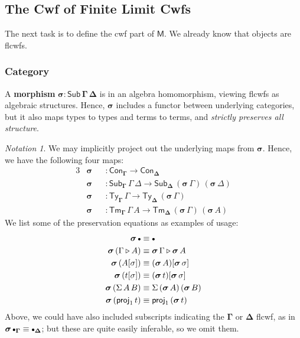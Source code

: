 \documentclass[12pt,a4paper,twoside,openany]{book}
\theoremstyle{remark}
\newtheorem{notation}{Notation}
\theoremstyle{definition}
\theoremstyle{theorem}
\newcommand{\bs}[1]{\boldsymbol{#1}}
\newcommand{\Con}{\mathsf{Con}}
\newcommand{\Sub}{\mathsf{Sub}}
\newcommand{\Tm}{\mathsf{Tm}}
\newcommand{\Ty}{\mathsf{Ty}}
\newcommand{\proj}{\mathsf{proj}}
\newcommand{\ext}{\triangleright}
\newcommand{\emptycon}{\scaleobj{.75}\bullet}
\newcommand{\bSub}{\bs{\Sub}}
\newcommand{\bGamma}{\bs{\Gamma}}
\newcommand{\bDelta}{\bs{\Delta}}
\newcommand{\bsigma}{\bs{\sigma}}
\newcommand{\bM}{\bs{\mathsf{M}}}
\begin{document}
\subsection{The Cwf of Finite Limit Cwfs}

The next task is to define the cwf part of $\bM$. We already know that objects
are flcwfs.

\subsubsection{Category}

A \textbf{morphism} $\bsigma : \bSub\,\bGamma\,\bDelta$ is in an algebra
homomorphism, viewing flcwfs as algebraic structures. Hence, $\bsigma$ includes
a functor between underlying categories, but it also maps types to types and
terms to terms, and \emph{strictly preserves all structure}.

\begin{notation}
We may implicitly project out the underlying maps from $\bsigma$. Hence, we
have the following four maps:
\begin{alignat*}{3}
  & \bsigma &&: \Con_{\bGamma} \to \Con_{\bDelta} \\
  & \bsigma &&: \Sub_{\bGamma}\,\Gamma\,\Delta \to \Sub_{\bDelta}\,(\bsigma\,\Gamma)\,(\bsigma\,\Delta)\\
  & \bsigma &&: \Ty_{\bGamma}\,\Gamma \to \Ty_{\bDelta}\,(\bsigma\,\Gamma)\\
  & \bsigma &&: \Tm_{\bGamma}\,\Gamma\,A \to \Tm_{\bDelta}\,(\bsigma\,\Gamma)\,(\bsigma\,A)
\end{alignat*}
We list some of the preservation equations as examples of usage:
\begin{alignat*}{3}
  \bsigma\,\emptycon &\equiv \emptycon \\
  \bsigma\,(\Gamma \ext A) &\equiv \bsigma\,\Gamma \ext \bsigma\,A\\
  \bsigma\,(A[\sigma]) &\equiv (\bsigma\,A)[\bsigma\,\sigma]\\
  \bsigma\,(t[\sigma]) &\equiv (\bsigma\,t)[\bsigma\,\sigma]\\
  \bsigma\,(\Sigma\,A\,B) &\equiv \Sigma\,(\bsigma\,A)\,(\bsigma\,B)\\
  \bsigma\,(\proj_1\,t) &\equiv \proj_1\,(\bsigma\,t)
\end{alignat*}
Above, we could have also included subscripts indicating the $\bGamma$ or
$\bDelta$ flcwf, as in $\bsigma\,\emptycon_{\bGamma} \equiv
\emptycon_{\bDelta}$; but these are quite easily inferable, so we omit them.
\end{notation}
\end{document}
